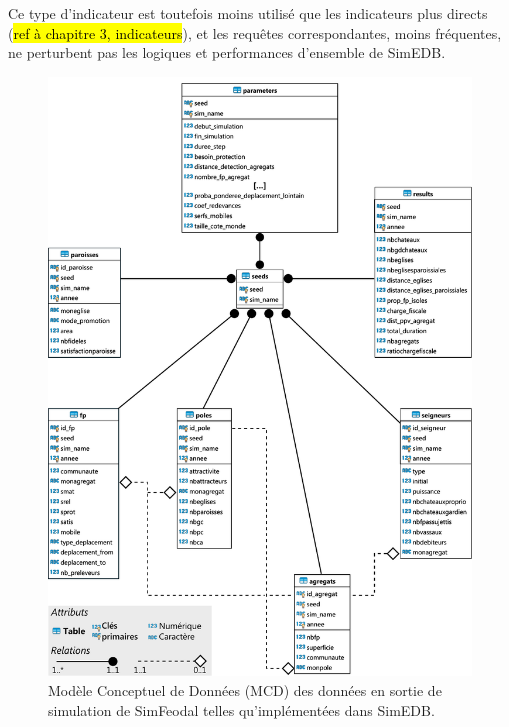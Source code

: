 		Ce type d'indicateur est toutefois moins utilisé que les indicateurs plus directs (\hl{ref à chapitre 3, indicateurs}), et les requêtes correspondantes, moins fréquentes, ne perturbent pas les logiques et performances d'ensemble de SimEDB.

\clearpage
		\begin{figure}[H]
			\centering
			\captionsetup{width=\linewidth}
			\includegraphics[width=\linewidth]{img/MCD_SimEDB_repris.pdf}
			\caption{Modèle Conceptuel de Données (MCD) des données en sortie de simulation de SimFeodal telles qu'implémentées dans SimEDB.}
			\label{fig:MCD_SimEDB}
		\end{figure}
\clearpage

